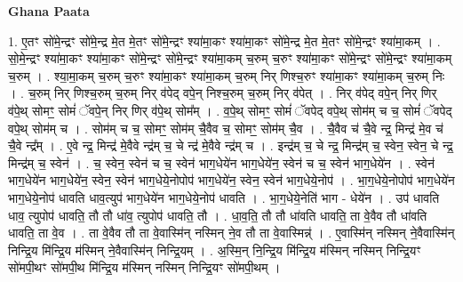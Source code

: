 \documentclass[17pt]{extarticle}
\begin{document}
\textbf{Ghana Paata } \newline

1. ए॒तꣳ सो॑मे॒न्द्रꣳ सो॑मे॒न्द्र मे॒त मे॒तꣳ सो॑मे॒न्द्रꣳ श्या॑मा॒कꣳ श्या॑मा॒कꣳ सो॑मे॒न्द्र मे॒त मे॒तꣳ सो॑मे॒न्द्रꣳ श्या॑मा॒कम् । . सो॒मे॒न्द्रꣳ श्या॑मा॒कꣳ श्या॑मा॒कꣳ सो॑मे॒न्द्रꣳ सो॑मे॒न्द्रꣳ श्या॑मा॒कम् च॒रुम् च॒रुꣳ श्या॑मा॒कꣳ सो॑मे॒न्द्रꣳ सो॑मे॒न्द्रꣳ श्या॑मा॒कम् च॒रुम् । . श्या॒मा॒कम् च॒रुम् च॒रुꣳ श्या॑मा॒कꣳ श्या॑मा॒कम् च॒रुम् निर् णिश्च॒रुꣳ श्या॑मा॒कꣳ श्या॑मा॒कम् च॒रुम् निः । . च॒रुम् निर् णिश्च॒रुम् च॒रुम् निर् व॑पेद् वपे॒न् निश्च॒रुम् च॒रुम् निर् व॑पेत् । . निर् व॑पेद् वपे॒न् निर् णिर् व॑पे॒थ् सोमꣳ॒॒ सोमं॑ ॅवपे॒न् निर् णिर् व॑पे॒थ् सोम᳚म् । . व॒पे॒थ् सोमꣳ॒॒ सोमं॑ ॅवपेद् वपे॒थ् सोम॑म् च च॒ सोमं॑ ॅवपेद् वपे॒थ् सोम॑म् च । . सोम॑म् च च॒ सोमꣳ॒॒ सोम॑म् चै॒वैव च॒ सोमꣳ॒॒ सोम॑म् चै॒व । . चै॒वैव च॑ चै॒वे न्द्र॒ मिन्द्र॑ मे॒व च॑ चै॒वे न्द्र᳚म् । . ए॒वे न्द्र॒ मिन्द्र॑ मे॒वैवे न्द्र॑म् च॒ चे न्द्र॑ मे॒वैवे न्द्र॑म् च । . इन्द्र॑म् च॒ चे न्द्र॒ मिन्द्र॑म् च॒ स्वेन॒ स्वेन॒ चे न्द्र॒ मिन्द्र॑म् च॒ स्वेन॑ । . च॒ स्वेन॒ स्वेन॑ च च॒ स्वेन॑ भाग॒धेये॑न भाग॒धेये॑न॒ स्वेन॑ च च॒ स्वेन॑ भाग॒धेये॑न । . स्वेन॑ भाग॒धेये॑न भाग॒धेये॑न॒ स्वेन॒ स्वेन॑ भाग॒धेये॒नोपोप॑ भाग॒धेये॑न॒ स्वेन॒ स्वेन॑ भाग॒धेये॒नोप॑ । . भा॒ग॒धेये॒नोपोप॑ भाग॒धेये॑न भाग॒धेये॒नोप॑ धावति धाव॒त्युप॑ भाग॒धेये॑न भाग॒धेये॒नोप॑ धावति । . भा॒ग॒धेये॒नेति॑ भाग - धेये॑न । . उप॑ धावति धाव॒ त्युपोप॑ धावति॒ तौ तौ धा॑व॒ त्युपोप॑ धावति॒ तौ । . धा॒व॒ति॒ तौ तौ धा॑वति धावति॒ ता वे॒वैव तौ धा॑वति धावति॒ ता वे॒व । . ता वे॒वैव तौ ता वे॒वास्मि॑न् नस्मिन् ने॒व तौ ता वे॒वास्मिन्न्॑ । . ए॒वास्मि॑न् नस्मिन् ने॒वैवास्मि॑न् निन्द्रि॒य मि॑न्द्रि॒य म॑स्मिन् ने॒वैवास्मि॑न् निन्द्रि॒यम् । . अ॒स्मि॒न् नि॒न्द्रि॒य मि॑न्द्रि॒य म॑स्मिन् नस्मिन् निन्द्रि॒यꣳ सो॑मपी॒थꣳ सो॑मपी॒थ मि॑न्द्रि॒य म॑स्मिन् नस्मिन् निन्द्रि॒यꣳ सो॑मपी॒थम् । \newline
\end{document}

